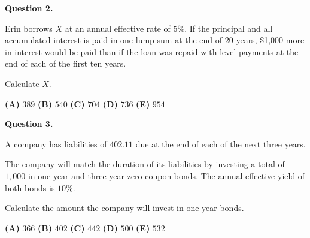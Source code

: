 \documentclass[11pt]{article}
\begin{document}
\noindent\textbf{Question 2.}  

Erin borrows $X$ at an annual effective rate of $5\%$. If the principal and all accumulated interest is paid in one lump sum at the end of 20 years, \$1{,}000 more in interest would be paid than if the loan was repaid with level payments at the end of each of the first ten years.

Calculate $X$.

\medskip

\begin{center}

\textbf{(A)} $389$
\hspace{1cm}
\textbf{(B)} $540$
\hspace{1cm}
\textbf{(C)} $704$
\hspace{1cm}
\textbf{(D)} $736$
\hspace{1cm}
\textbf{(E)} $954$

\end{center}

\newpage


\noindent\textbf{Question 3.}  

A company has liabilities of $402.11$ due at the end of each of the next three years.

The company will match the duration of its liabilities by investing a total of $1{,}000$ in one-year and three-year zero-coupon bonds. The annual effective yield of both bonds is $10\%$.

Calculate the amount the company will invest in one-year bonds.

\medskip

\begin{center}

\textbf{(A)} $366$
\hspace{1cm}
\textbf{(B)} $402$
\hspace{1cm}
\textbf{(C)} $442$
\hspace{1cm}
\textbf{(D)} $500$
\hspace{1cm}
\textbf{(E)} $532$

\end{center}

\newpage
\end{document}

